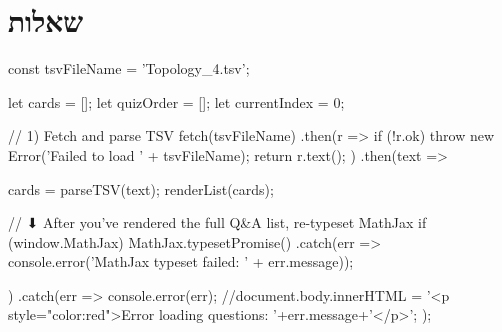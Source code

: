 \documentclass{tstextbook}
\begin{document}
\section{שאלות}


    const tsvFileName = 'Topology_4.tsv';

    let cards = [];
    let quizOrder = [];
    let currentIndex = 0;

    // 1) Fetch and parse TSV
fetch(tsvFileName)
  .then(r => {
    if (!r.ok) throw new Error('Failed to load ' + tsvFileName);
    return r.text();
  })
  .then(text => {
    cards = parseTSV(text);
    renderList(cards);

    // ⬇ After you’ve rendered the full Q&A list, re-typeset MathJax
    if (window.MathJax) {
      MathJax.typesetPromise()
        .catch(err => console.error('MathJax typeset failed: ' + err.message));
    }
  })
  .catch(err => {
    console.error(err);
    //document.body.innerHTML =  '<p style="color:red">Error loading questions: '+err.message+'</p>';
  });
\end{document}
